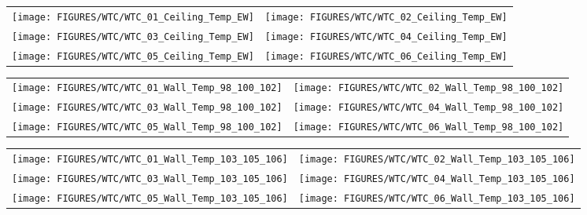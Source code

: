 \begin{figure}[p]
\begin{tabular*}{\textwidth}{l@{\extracolsep{\fill}}r}
\texttt{[image: FIGURES/WTC/WTC\_01\_Ceiling\_Temp\_EW]} &
\texttt{[image: FIGURES/WTC/WTC\_02\_Ceiling\_Temp\_EW]} \\
\texttt{[image: FIGURES/WTC/WTC\_03\_Ceiling\_Temp\_EW]} &
\texttt{[image: FIGURES/WTC/WTC\_04\_Ceiling\_Temp\_EW]} \\
\texttt{[image: FIGURES/WTC/WTC\_05\_Ceiling\_Temp\_EW]} &
\texttt{[image: FIGURES/WTC/WTC\_06\_Ceiling\_Temp\_EW]}
\end{tabular*}
\label{NIST_WTC_Ceiling_EW}
\end{figure}

\begin{figure}[p]
\begin{tabular*}{\textwidth}{l@{\extracolsep{\fill}}r}
\texttt{[image: FIGURES/WTC/WTC\_01\_Wall\_Temp\_98\_100\_102]} &
\texttt{[image: FIGURES/WTC/WTC\_02\_Wall\_Temp\_98\_100\_102]} \\
\texttt{[image: FIGURES/WTC/WTC\_03\_Wall\_Temp\_98\_100\_102]} &
\texttt{[image: FIGURES/WTC/WTC\_04\_Wall\_Temp\_98\_100\_102]} \\
\texttt{[image: FIGURES/WTC/WTC\_05\_Wall\_Temp\_98\_100\_102]} &
\texttt{[image: FIGURES/WTC/WTC\_06\_Wall\_Temp\_98\_100\_102]}
\end{tabular*}
\label{NIST_WTC_Wall_98_100_102}
\end{figure}

\begin{figure}[p]
\begin{tabular*}{\textwidth}{l@{\extracolsep{\fill}}r}
\texttt{[image: FIGURES/WTC/WTC\_01\_Wall\_Temp\_103\_105\_106]} &
\texttt{[image: FIGURES/WTC/WTC\_02\_Wall\_Temp\_103\_105\_106]} \\
\texttt{[image: FIGURES/WTC/WTC\_03\_Wall\_Temp\_103\_105\_106]} &
\texttt{[image: FIGURES/WTC/WTC\_04\_Wall\_Temp\_103\_105\_106]} \\
\texttt{[image: FIGURES/WTC/WTC\_05\_Wall\_Temp\_103\_105\_106]} &
\texttt{[image: FIGURES/WTC/WTC\_06\_Wall\_Temp\_103\_105\_106]}
\end{tabular*}
\label{NIST_WTC_Wall_103_105_106}
\end{figure}

